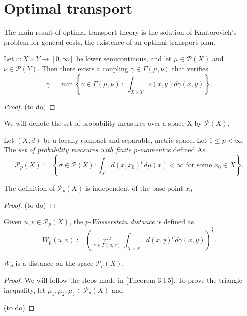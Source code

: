 \section{Optimal transport}
The main result of optimal transport theory is the solution of Kantorovich's problem for general costs, the existence of an optimal transport plan.

\begin{proposition}
    Let $ c: X \times Y \to [0, \infty] $ be lower semicontinous, and let $ \mu \in \mathcal P(X) $ and $ \nu \in \mathcal P(Y) $. Then there exists a coupling $ \bar \gamma \in \Gamma(\mu, \nu) $ that verifies
    $$
        \bar \gamma = \min \left\{ \gamma \in \Gamma(\mu, \nu) \ : \ \int_{X \times Y} c(x, y) d\gamma(x,y) \right\}.
    $$
\end{proposition}
\begin{proof}
    (to do)
\end{proof}

We will denote the set of probability measures over a space X by $ \mathcal P(X) $. 

\begin{example}
    
\end{example}

\begin{definition}
    Let $ (X, d) $ be a locally compact and separable, metric space. Let $ 1 \leq p < \infty $. The {\it set of probability measures with finite $p$-moment} is defined As
    $$
        \mathcal P_p (X) := \left\{ \sigma \in \mathcal P (X) : \int_X d(x, x_0)^p d \mu (x) < \infty \text{ for some } x_0 \in X \right\}.
    $$
\end{definition}

\begin{proposition}
    The definition of $ \mathcal P_p (X) $ is independent of the base point $ x_0 $
\end{proposition}
\begin{proof}
    (to do)
\end{proof}

\begin{definition}
    Given $ u, v \in \mathcal P_p (X) $, the {\it $p$-Wasserstein distance} is defined as
    $$
        W_p(u, v) := \left( \inf_{\gamma \in \Gamma(u, v)} \int_{X \times X} d(x,y)^p d\gamma(x, y)\right)^{\frac{1}{p}}.
    $$
\end{definition}

\begin{proposition}
    $W_p$ is a distance on the space $ \mathcal P_p(X) $.
\end{proposition}

\begin{proof}
    We will follow the steps made in \cite{Figalli}[Theorem 3.1.5].
    To prove the triangle inequality, let $ \mu_1, \mu_2, \mu_3 \in \mathcal P_p(X) $ and 

    (to do)
\end{proof}
